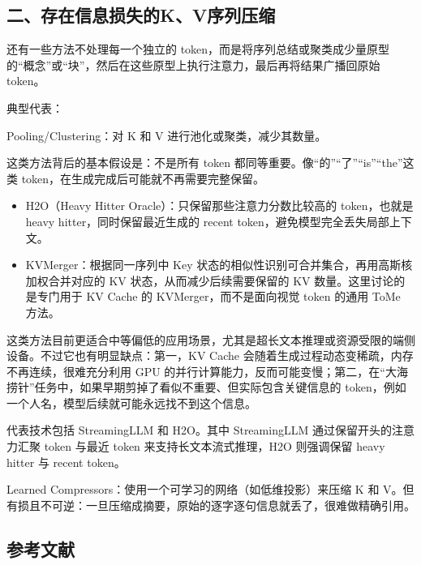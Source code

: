 \hypertarget{ux4e8cux5b58ux5728ux4fe1ux606fux635fux5931ux7684kvux5e8fux5217ux538bux7f29}{%
\subsection{二、存在信息损失的K、V序列压缩}\label{ux4e8cux5b58ux5728ux4fe1ux606fux635fux5931ux7684kvux5e8fux5217ux538bux7f29}}

还有一些方法不处理每一个独立的 token，而是将序列总结或聚类成少量原型的``概念''或``块''，然后在这些原型上执行注意力，最后再将结果广播回原始 token。

典型代表：

Pooling/Clustering：对 K 和 V 进行池化或聚类，减少其数量。

这类方法背后的基本假设是：不是所有 token 都同等重要。像``的''``了''``is''``the''这类 token，在生成完成后可能就不再需要完整保留。

\begin{itemize}
\tightlist
\item
  H2O（Heavy Hitter Oracle）：只保留那些注意力分数比较高的 token，也就是 heavy hitter，同时保留最近生成的 recent token，避免模型完全丢失局部上下文。
\item
  KVMerger：根据同一序列中 Key 状态的相似性识别可合并集合，再用高斯核加权合并对应的 KV 状态，从而减少后续需要保留的 KV 数量。这里讨论的是专门用于 KV Cache 的 KVMerger，而不是面向视觉 token 的通用 ToMe 方法。
\end{itemize}

这类方法目前更适合中等偏低的应用场景，尤其是超长文本推理或资源受限的端侧设备。不过它也有明显缺点：第一，KV Cache 会随着生成过程动态变稀疏，内存不再连续，很难充分利用 GPU 的并行计算能力，反而可能变慢；第二，在``大海捞针''任务中，如果早期剪掉了看似不重要、但实际包含关键信息的 token，例如一个人名，模型后续就可能永远找不到这个信息。

代表技术包括 StreamingLLM 和 H2O。其中 StreamingLLM 通过保留开头的注意力汇聚 token 与最近 token 来支持长文本流式推理，H2O 则强调保留 heavy hitter 与 recent token。

Learned Compressors：使用一个可学习的网络（如低维投影）来压缩 K 和 V。但有损且不可逆：一旦压缩成摘要，原始的逐字逐句信息就丢了，很难做精确引用。

\hypertarget{ux53c2ux8003ux6587ux732e-96}{%
\subsection{参考文献}\label{ux53c2ux8003ux6587ux732e-96}}

